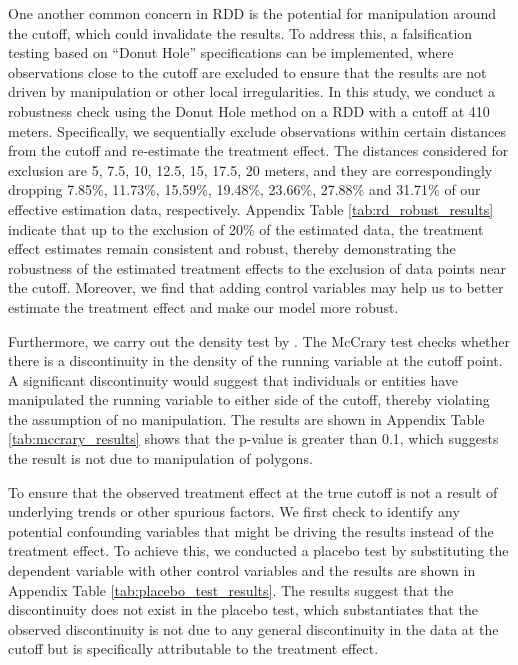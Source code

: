 \documentclass[11pt]{article}
\begin{document}
One another common concern in RDD is the potential for manipulation around the cutoff, which could invalidate the results. To address this, a falsification testing based on ``Donut Hole'' specifications can be implemented, where observations close to the cutoff are excluded to ensure that the results are not driven by manipulation or other local irregularities. 
In this study, we conduct a robustness check using the Donut Hole method on a RDD with a cutoff at 410 meters. Specifically, we sequentially exclude observations within certain distances from the cutoff and re-estimate the treatment effect. The distances considered for exclusion are 5, 7.5, 10, 12.5, 15, 17.5, 20 meters, and they are correspondingly dropping 7.85\%, 11.73\%, 15.59\%, 19.48\%, 23.66\%, 27.88\% and 31.71\% of our effective estimation data, respectively. Appendix Table \ref{tab:rd_robust_results} indicate that up to the exclusion of 20\% of the estimated data, the treatment effect estimates remain consistent and robust, thereby demonstrating the robustness of the estimated treatment effects to the exclusion of data points near the cutoff. Moreover, we find that adding control variables may help us to better estimate the treatment effect and make our model more robust.

Furthermore, we carry out the density test by \citep{MCCRARY2008698}. The McCrary test checks whether there is a discontinuity in the density of the running variable at the cutoff point. A significant discontinuity would suggest that individuals or entities have manipulated the running variable to either side of the cutoff, thereby violating the assumption of no manipulation. The results are shown in Appendix Table \ref{tab:mccrary_results} shows that the p-value is greater than 0.1, which suggests the result is not due to manipulation of polygons.

To ensure that the observed treatment effect at the true cutoff is not a result of underlying trends or other spurious factors. We first check to identify any potential confounding variables that might be driving the results instead of the treatment effect. To achieve this, we conducted a placebo test by substituting the dependent variable with other control variables and the results are shown in Appendix Table \ref{tab:placebo_test_results}. The results suggest that the discontinuity does not exist in the placebo test, which substantiates that the observed discontinuity is not due to any general discontinuity in the data at the cutoff but is specifically attributable to the treatment effect.
\end{document}
